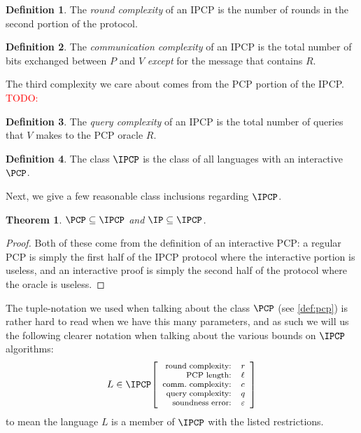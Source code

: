 \documentclass[english,12pt]{reedthesis}
\theoremstyle{plain}
\newtheorem{thm}{Theorem}[section]
\theoremstyle{definition}
\newtheorem{defn}[defn]{Definition}
\theoremstyle{remark}
\newcommand{\ipcp}[5]{%
  \ensuremath%
  \mleft[{\footnotesize\begin{array}{r l}
    \text{round complexity:} & #1 \\
    \text{PCP length:} & #2 \\
    \text{comm.\ complexity:} & #3 \\
    \text{query complexity:} & #4 \\
    \text{soundness error:} & #5
  \end{array}}\mright]%
}
\newcommand{\TODO}[1]{\textcolor{red}{TODO: #1}}
\begin{document}
\begin{defn}\label{def:ipcp-round-complexity}
  The \emph{round complexity} of an IPCP is the number of rounds in the second
  portion of the protocol.
\end{defn}

\begin{defn}\label{def:ipcp-comm-complexity}
  The \emph{communication complexity} of an IPCP is the total number of bits
  exchanged between $P$ and $V$ \emph{except} for the message that contains $R$.
\end{defn}

The third complexity we care about comes from the PCP portion of the IPCP\@.
\TODO{}

\begin{defn}
  The \emph{query complexity} of an IPCP is the total number of queries that $V$
  makes to the PCP oracle $R$.
\end{defn}

\begin{defn}\label{def:ipcp-class}
  The class $\IPCP$ is the class of all languages with an interactive $\PCP$.
\end{defn}

Next, we give a few reasonable class inclusions regarding $\IPCP$.

\begin{thm}
  $\PCP \subseteq \IPCP$ and $\IP \subseteq \IPCP$.
\end{thm}

\begin{proof}
  Both of these come from the definition of an interactive PCP: a regular PCP is
  simply the first half of the IPCP protocol where the interactive portion is
  useless, and an interactive proof is simply the second half of the protocol
  where the oracle is useless.
\end{proof}

The tuple-notation we used when talking about the class $\PCP$ (see
\cref{def:pcp}) is rather hard to read when we have this many parameters, and as
such we will us the following clearer notation when talking about the various
bounds on $\IPCP$ algorithms:
\begin{equation*}
  L \in \IPCP\ipcp{r}{\ell}{c}{q}{\varepsilon}
\end{equation*}
to mean the language $L$ is a member of $\IPCP$ with the listed restrictions.
\end{document}
